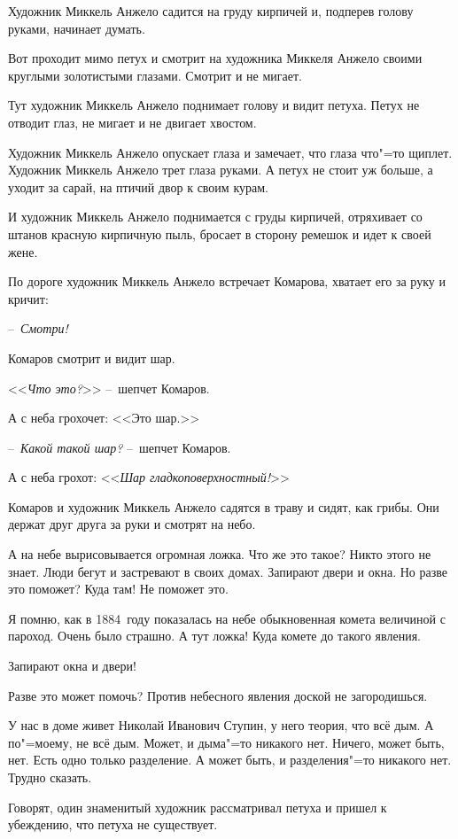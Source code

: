
Художник Миккель Анжело садится на груду кирпичей и, подперев голову руками, начинает думать.

Вот проходит мимо петух и смотрит на художника Миккеля Анжело своими круглыми золотистыми глазами. Смотрит и не мигает.

Тут художник Миккель Анжело поднимает голову и видит петуха. Петух не отводит глаз, не мигает и не двигает хвостом.

Художник Миккель Анжело опускает глаза и замечает, что глаза что"=то щиплет. Художник Миккель Анжело трет глаза руками. А петух не стоит уж больше, а уходит за сарай, на птичий двор к своим курам.

И художник Миккель Анжело поднимается с груды кирпичей, отряхивает со штанов красную кирпичную пыль, бросает в сторону ремешок и идет к своей жене.

По дороге художник Миккель Анжело встречает Комарова, хватает его за руку и кричит:

--~\textit{Смотри!}

Комаров смотрит и видит шар.

<<\textit{Что это?}>> --~шепчет Комаров.

А с неба грохочет: <<Это шар.>>

--~\textit{Какой такой шар?} --~шепчет Комаров.

А с неба грохот: <<\textit{Шар гладкоповерхностный!}>>

Комаров и художник Миккель Анжело садятся в траву и сидят, как грибы. Они держат друг друга за руки и смотрят на небо.

А на небе вырисовывается огромная ложка. Что же это такое? Никто этого не знает. Люди бегут и застревают в своих домах. Запирают двери и окна. Но разве это поможет? Куда там! Не поможет это.

Я помню, как в 1884~году показалась на небе обыкновенная комета величиной с пароход. Очень было страшно. А тут ложка! Куда комете до такого явления.

Запирают окна и двери! 

Разве это может помочь? Против небесного явления доской не загородишься.

У нас в доме живет Николай Иванович Ступин, у него теория, что всё дым. А по"=моему, не всё дым. Может, и дыма"=то никакого нет. Ничего, может быть, нет. Есть одно только разделение. А может быть, и разделения"=то никакого нет. Трудно сказать.

Говорят, один знаменитый художник рассматривал петуха и пришел к убеждению, что петуха не существует.

